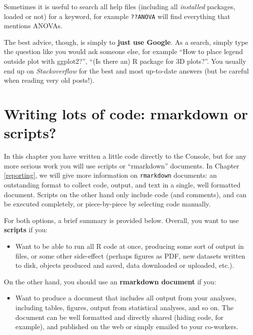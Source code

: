 \documentclass[]{book}
\providecommand{\tightlist}{%
  \setlength{\itemsep}{0pt}\setlength{\parskip}{0pt}}
\begin{document}
Sometimes it is useful to search all help files (including all \emph{installed} packages, loaded or not) for a keyword, for example \texttt{??ANOVA} will find everything that mentions ANOVAs.

The best advice, though, is simply to \textbf{just use Google}. As a search, simply type the question like you would ask someone else, for example ``How to place legend outside plot with ggplot2?'', ``(Is there an) R package for 3D plots?''. You usually end up on \emph{Stackoverflow} for the best and most up-to-date answers (but be careful when reading very old posts!).

\hypertarget{writing-lots-of-code-rmarkdown-or-scripts}{%
\section{Writing lots of code: rmarkdown or scripts?}\label{writing-lots-of-code-rmarkdown-or-scripts}}

In this chapter you have written a little code directly to the Console, but for any more serious work you will use scripts or ``rmarkdown'' documents. In Chapter \ref{reporting}, we will give more information on \texttt{rmarkdown} documents: an outstanding format to collect code, output, and text in a single, well formatted document. Scripts on the other hand only include code (and comments), and can be executed completely, or piece-by-piece by selecting code manually.

For both options, a brief summary is provided below. Overall, you want to use \textbf{scripts} if you:

\begin{itemize}
\tightlist
\item
  Want to be able to run all R code at once, producing some sort of output in files, or some other side-effect (perhaps figures as PDF, new datasets written to disk, objects produced and saved, data downloaded or uploaded, etc.).
\end{itemize}

On the other hand, you should use an \textbf{rmarkdown document} if you:

\begin{itemize}
\tightlist
\item
  Want to produce a document that includes all output from your analyses, including tables, figures, output from statistical analyses, and so on. The document can be well formatted and directly shared (hiding code, for example), and published on the web or simply emailed to your co-workers.
\end{itemize}
\end{document}
